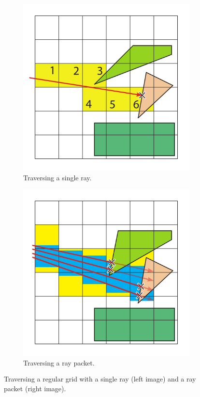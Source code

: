 \begin{figure}
	\centering
	\begin{subfigure}[t]{0.44\textwidth}
		\centering
		\includegraphics[width=\textwidth]{images/cell_traverser}
		\caption{
			Traversing a single ray.
		}
		\label{fig:cell_traverser}
	\end{subfigure}
	\begin{subfigure}[t]{0.44\textwidth}
		\centering
		\includegraphics[width=\textwidth]{images/slice_traverser}
		\caption{
			Traversing a ray packet.
		}
		\label{fig:slice_traverser}
	\end{subfigure}
	\caption{
		Traversing a regular grid with a single ray (left image) and a ray packet (right image).
	}
	\label{fig:traverser}
\end{figure}

